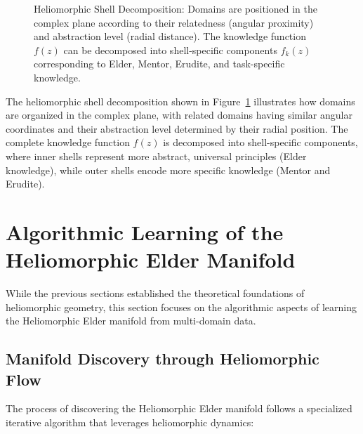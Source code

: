 \begin{figure}[h]
\caption{Heliomorphic Shell Decomposition: Domains are positioned in the complex plane according to their relatedness (angular proximity) and abstraction level (radial distance). The knowledge function $f(z)$ can be decomposed into shell-specific components $f_k(z)$ corresponding to Elder, Mentor, Erudite, and task-specific knowledge.}
\label{fig:shell_decomposition}
\end{figure}

The heliomorphic shell decomposition shown in Figure~\ref{fig:shell_decomposition} illustrates how domains are organized in the complex plane, with related domains having similar angular coordinates and their abstraction level determined by their radial position. The complete knowledge function $f(z)$ is decomposed into shell-specific components, where inner shells represent more abstract, universal principles (Elder knowledge), while outer shells encode more specific knowledge (Mentor and Erudite).

\section{Algorithmic Learning of the Heliomorphic Elder Manifold}

While the previous sections established the theoretical foundations of heliomorphic geometry, this section focuses on the algorithmic aspects of learning the Heliomorphic Elder manifold from multi-domain data.

\subsection{Manifold Discovery through Heliomorphic Flow}

The process of discovering the Heliomorphic Elder manifold follows a specialized iterative algorithm that leverages heliomorphic dynamics:

